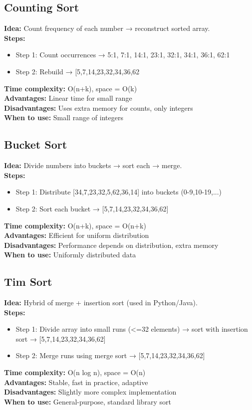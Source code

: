 \documentclass[a4paper,12pt]{article}
\begin{document}
\subsection{Counting Sort}
\textbf{Idea:} Count frequency of each number → reconstruct sorted array.  \\
\textbf{Steps:} 
\begin{itemize}
\item Step 1: Count occurrences → 5:1, 7:1, 14:1, 23:1, 32:1, 34:1, 36:1, 62:1

\item Step 2: Rebuild → [5,7,14,23,32,34,36,62
\end{itemize}
\textbf{Time complexity:} O(n+k), space = O(k)\\
\textbf{Advantages:} Linear time for small range\\
\textbf{Disadvantages:} Uses extra memory for counts, only integers\\
\textbf{When to use:} Small range of integers
\subsection{Bucket Sort}
\textbf{Idea:} Divide numbers into buckets → sort each → merge.  \\
\textbf{Steps:}  
\begin{itemize}
\item Step 1: Distribute [34,7,23,32,5,62,36,14] into buckets (0-9,10-19,...)

\item Step 2: Sort each bucket → [5,7,14,23,32,34,36,62]
\end{itemize}
\textbf{Time complexity:} O(n+k), space = O(n+k)\\
\textbf{Advantages:} Efficient for uniform distribution\\
\textbf{Disadvantages:} Performance depends on distribution, extra memory\\
\textbf{When to use:} Uniformly distributed data
\subsection{Tim Sort}
\textbf{Idea:} Hybrid of merge + insertion sort (used in Python/Java).  \\
\textbf{Steps:} 
\begin{itemize}
\item Step 1: Divide array into small runs (<=32 elements) → sort with insertion sort → [5,7,14,23,32,34,36,62]

\item Step 2: Merge runs using merge sort → [5,7,14,23,32,34,36,62]
\end{itemize}
\textbf{Time complexity:} O(n log n), space = O(n)\\
\textbf{Advantages:} Stable, fast in practice, adaptive\\
\textbf{Disadvantages:} Slightly more complex implementation\\
\textbf{When to use:} General-purpose, standard library sort
\newpage
\end{document}
